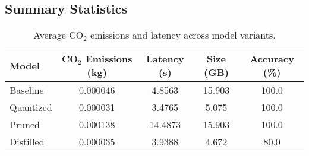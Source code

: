 
\subsection{Summary Statistics}
\begin{table}[htbp]
\centering
\caption{Average CO$_2$ emissions and latency across model variants.}
\begin{tabular}{lcccc}
\toprule
\textbf{Model} & \textbf{CO$_2$ Emissions (kg)} & \textbf{Latency (s)} & \textbf{Size (GB)} & \textbf{Accuracy (\%)}\\
\midrule
Baseline  & 0.000046 & 4.8563 & 15.903 & 100.0\\
Quantized & 0.000031 & 3.4765 & 5.075 & 100.0\\
Pruned    & 0.000138 & 14.4873 & 15.903 & 100.0\\
Distilled & 0.000035 & 3.9388 & 4.672 & 80.0\\
\bottomrule
\end{tabular}
\label{tab:avg_metrics}
\end{table}
